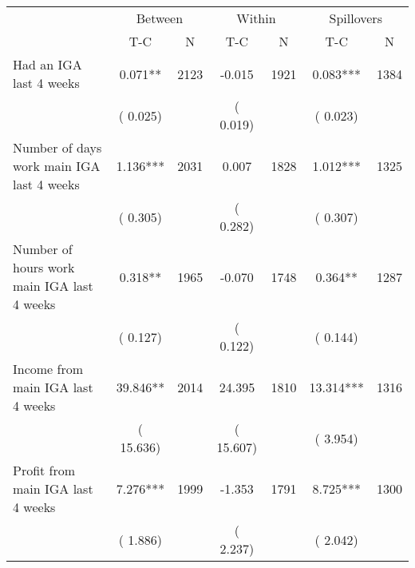 
\begin{tabular}{l*{6}{c}}\hline&\multicolumn{2}{c}{Between}&\multicolumn{2}{c}{Within}&\multicolumn{2}{c}{Spillovers} \\ \cmidrule(r){2-3}\cmidrule(l){4-5}\cmidrule(l){6-7} & {T-C} & {N} & {T-C} & {N}  & {T-C}  & {N}  \\ \midrule
Had an IGA last 4 weeks        &              0.071**      &       2123       &             -0.015      &       1921       &              0.083***      &       1384       \\
                       &       (       0.025)            &                               &       (       0.019)            &                               &       (       0.023)            &                               \\
Number of days work main IGA last 4 weeks        &              1.136***      &       2031       &              0.007      &       1828       &              1.012***      &       1325       \\
                       &       (       0.305)            &                               &       (       0.282)            &                               &       (       0.307)            &                               \\
Number of hours work main IGA last 4 weeks        &              0.318**      &       1965       &             -0.070      &       1748       &              0.364**      &       1287       \\
                       &       (       0.127)            &                               &       (       0.122)            &                               &       (       0.144)            &                               \\
Income from main IGA last 4 weeks        &             39.846**      &       2014       &             24.395      &       1810       &             13.314***      &       1316       \\
                       &       (      15.636)            &                               &       (      15.607)            &                               &       (       3.954)            &                               \\
Profit from main IGA last 4 weeks        &              7.276***      &       1999       &             -1.353      &       1791       &              8.725***      &       1300       \\
                       &       (       1.886)            &                               &       (       2.237)            &                               &       (       2.042)            &                               \\

\end{tabular}
